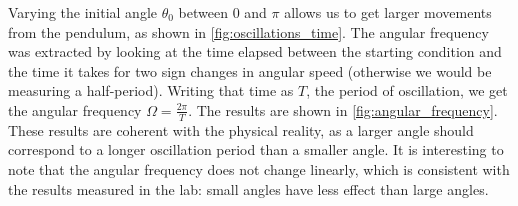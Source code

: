 Varying the initial angle \(\theta_0\) between \(0\) and \(\pi\) allows us to get larger movements from the pendulum, as shown in \autoref{fig:oscillations_time}. The angular frequency was extracted by looking at the time elapsed between the starting condition and the time it takes for two sign changes in angular speed (otherwise we would be measuring a half-period). Writing that time as \(T\), the period of oscillation, we get the angular frequency \(\Omega = \frac{2\pi}{T}\). The results are shown in \autoref{fig:angular_frequency}. These results are coherent with the physical reality, as a larger angle should correspond to a longer oscillation period than a smaller angle. It is interesting to note that the angular frequency does not change linearly, which is consistent with the results measured in the lab: small angles have less effect than large angles.

